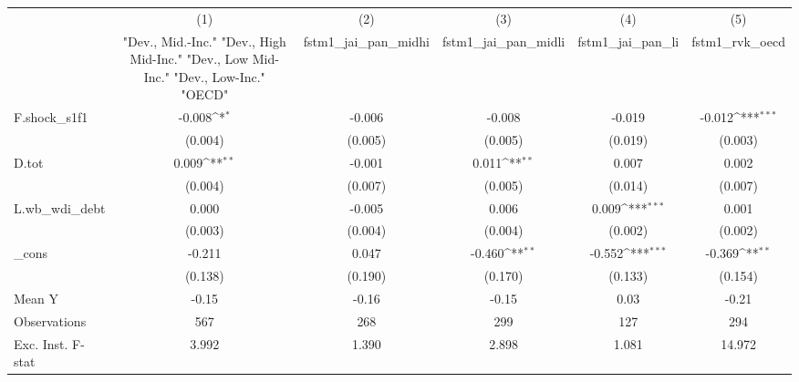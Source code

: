 {
\def\sym#1{\ifmmode^{#1}\else\(^{#1}\)\fi}
\begin{tabular}{l*{5}{c}}
\toprule
            &\multicolumn{1}{c}{(1)}&\multicolumn{1}{c}{(2)}&\multicolumn{1}{c}{(3)}&\multicolumn{1}{c}{(4)}&\multicolumn{1}{c}{(5)}\\
            &\multicolumn{1}{c}{ "Dev., Mid.-Inc." "Dev., High Mid-Inc." "Dev., Low Mid-Inc." "Dev., Low-Inc." "OECD" }&\multicolumn{1}{c}{fstm1\_jai\_pan\_midhi}&\multicolumn{1}{c}{fstm1\_jai\_pan\_midli}&\multicolumn{1}{c}{fstm1\_jai\_pan\_li}&\multicolumn{1}{c}{fstm1\_rvk\_oecd}\\
\midrule
F.shock\_s1f1&      -0.008\sym{*}  &      -0.006         &      -0.008         &      -0.019         &      -0.012\sym{***}\\
            &     (0.004)         &     (0.005)         &     (0.005)         &     (0.019)         &     (0.003)         \\
\addlinespace
D.tot       &       0.009\sym{**} &      -0.001         &       0.011\sym{**} &       0.007         &       0.002         \\
            &     (0.004)         &     (0.007)         &     (0.005)         &     (0.014)         &     (0.007)         \\
\addlinespace
L.wb\_wdi\_debt&       0.000         &      -0.005         &       0.006         &       0.009\sym{***}&       0.001         \\
            &     (0.003)         &     (0.004)         &     (0.004)         &     (0.002)         &     (0.002)         \\
\addlinespace
\_cons      &      -0.211         &       0.047         &      -0.460\sym{**} &      -0.552\sym{***}&      -0.369\sym{**} \\
            &     (0.138)         &     (0.190)         &     (0.170)         &     (0.133)         &     (0.154)         \\
\midrule
Mean Y      &       -0.15         &       -0.16         &       -0.15         &        0.03         &       -0.21         \\
Observations&         567         &         268         &         299         &         127         &         294         \\
Exc. Inst. F-stat&       3.992         &       1.390         &       2.898         &       1.081         &      14.972         \\
\bottomrule
\end{tabular}
}
